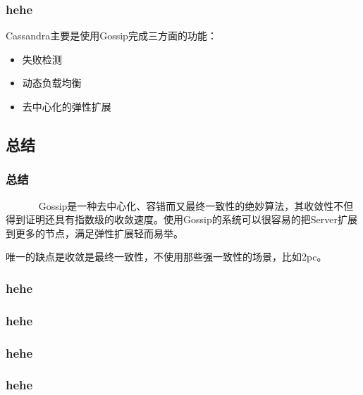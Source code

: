 \documentclass[slidestop,compress,mathserif,c]{beamer}
\begin{document}
\begin{frame}
\frametitle{hehe}
 Cassandra主要是使用Gossip完成三方面的功能：
\begin{itemize}
\item 失败检测
\item 动态负载均衡
\item 去中心化的弹性扩展
\end{itemize}
\end{frame}

\subsection{\hfill 总结}
\begin{frame}
\frametitle{总结}
~~~~~~ Gossip是一种去中心化、容错而又最终一致性的绝妙算法，其收敛性不但得到证明还具有指数级的收敛速度。使用Gossip的系统可以很容易的把Server扩展到更多的节点，满足弹性扩展轻而易举。
 
唯一的缺点是收敛是最终一致性，不使用那些强一致性的场景，比如2pc。
\end{frame}

\begin{frame}
\frametitle{hehe}
 
\end{frame}



\begin{frame}
\frametitle{hehe}
 
\end{frame}


\begin{frame}
\frametitle{hehe}
 
\end{frame}


\begin{frame}
\frametitle{hehe}
 
\end{frame}
\end{document}
